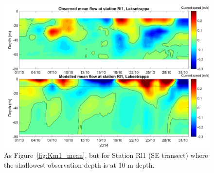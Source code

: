 \begin{figure}[htb]
	\centerline{
		\includegraphics*[trim=0 0 0 0,clip=true,width=\textwidth]{Figurer/AndreS/Rl1_Obs_vs_Mod_mean_v2}}
	\caption{\small As Figure~\ref{fig:Km1_mean}, but for Station Rl1 (SE transect) where the shallowest observation depth is at 10 m depth.}
	\label{fig:Rl1_mean}
\end{figure}

